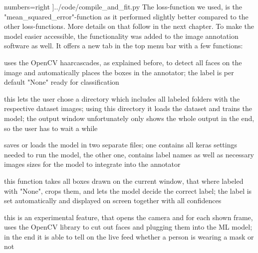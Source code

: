     numbers=right
    ]{../code/compile_and_fit.py}
The loss-function we used, is the "mean\_squared\_error"-function as it performed
slightly better compared to the other loss-functions. More details on that
follow in the next chapter.
\newline
To make the model easier accessible, the functionality was added to the image
annotation software as well. It offers a new tab in the top menu bar with a few
functions:
\begin{description}[font=\sffamily\bfseries, leftmargin=1cm, style=nextline]
    \item[auto detect faces]
        uses the OpenCV haarcascades, as explained before, to detect all faces
        on the image and automatically places the boxes in the annotator; the
        label is per default "None" ready for classification
    \item[train model]
        this lets the user chose a directory which includes all labeled folders
        with the respective dataset images; using this directory it loads the
        dataset and trains the model; the output window unfortunately only shows
        the whole output in the end, so the user has to wait a while
    \item[save/load model]
        saves or loads the model in two separate files; one contains all keras
        settings needed to run the model, the other one, contains label names as
        well as necessary images sizes for the model to integrate into the
        annotator 
    \item[classify current image]
        this function takes all boxes drawn on the current window, that where
        labeled with "None", crops them, and lets the model decide the correct
        label; the label is set automatically and displayed on screen together
        with all confidences
    \item[live classification]
        this is an experimental feature, that opens the camera and for each
        shown frame, uses the OpenCV library to cut out faces and plugging them
        into the ML model; in the end it is able to tell on the live feed
        whether a person is wearing a mask or not
\end{description}
